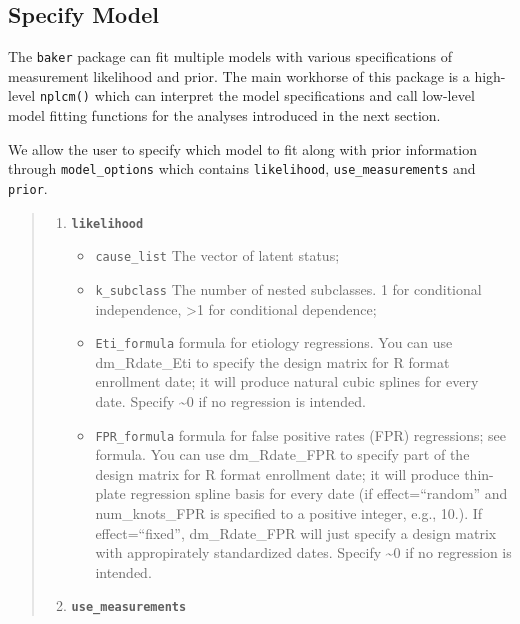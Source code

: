 \documentclass[article]{jss}
\begin{document}
\subsection{Specify Model}\label{specify-model}

The \texttt{baker} package can fit multiple models with various
specifications of measurement likelihood and prior. The main workhorse
of this package is a high-level \texttt{nplcm()} which can interpret the
model specifications and call low-level model fitting functions for the
analyses introduced in the next section.

We allow the user to specify which model to fit along with prior
information through \texttt{model\_options} which contains
\texttt{likelihood}, \texttt{use\_measurements} and \texttt{prior}.

\begin{quote}
\begin{enumerate}
\def\labelenumi{\arabic{enumi}.}
\itemsep1pt\parskip0pt
\item
  \textbf{\texttt{likelihood}}

  \begin{itemize}
  \itemsep1pt\parskip0pt
  \item
    \texttt{cause\_list} The vector of latent status;
  \item
    \texttt{k\_subclass} The number of nested subclasses. 1 for
    conditional independence, \textgreater{}1 for conditional
    dependence;
  \item
    \texttt{Eti\_formula} formula for etiology regressions. You can use
    dm\_Rdate\_Eti to specify the design matrix for R format enrollment
    date; it will produce natural cubic splines for every date. Specify
    \textasciitilde{}0 if no regression is intended.
  \item
    \texttt{FPR\_formula} formula for false positive rates (FPR)
    regressions; see formula. You can use dm\_Rdate\_FPR to specify part
    of the design matrix for R format enrollment date; it will produce
    thin-plate regression spline basis for every date (if
    effect=``random'' and num\_knots\_FPR is specified to a positive
    integer, e.g., 10.). If effect=``fixed'', dm\_Rdate\_FPR will just
    specify a design matrix with appropirately standardized dates.
    Specify \textasciitilde{}0 if no regression is intended.
  \end{itemize}
\item
  \textbf{\texttt{use\_measurements}}


\end{enumerate}
\end{quote}
\end{document}
